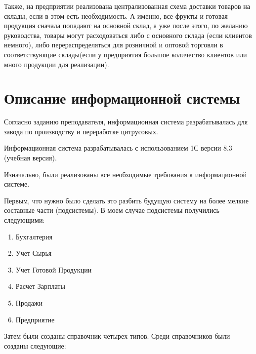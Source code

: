 \documentclass[12pt,a4paper]{article}
\begin{document}
Также, на предприятии реализована централизованная схема доставки товаров на склады, если в этом есть необходимость. А именно, все фрукты и готовая продукция сначала попадают на основной склад, а уже после этого, по желанию руководства, товары могут расходоваться либо с основного склада (если клиентов немного), либо перераспределяться для розничной и оптовой торговли в соответствующие склады(если у предприятия большое количество клиентов или много продукции для реализации).

\section{Описание информационной системы}
Согласно заданию преподавателя, информационная система разрабатывалась для завода по производству и переработке цитрусовых.

Информационная система разрабатывалась с использованием 1С версии 8.3 (учебная версия).

Изначально, были реализованы все необходимые требования к информационной системе.

Первым, что нужно было сделать это разбить будущую систему на более мелкие составные части (подсистемы). В моем случае подсистемы получились следующими:

\begin{enumerate}
    \item Бухгалтерия
    
    \item Учет Сырья
    
    \item Учет Готовой Продукции
    
    \item Расчет Зарплаты
    
    \item Продажи
    
    \item Предприятие
\end{enumerate}

Затем были созданы справочник четырех типов. Среди справочников были созданы следующие:
\end{document}
